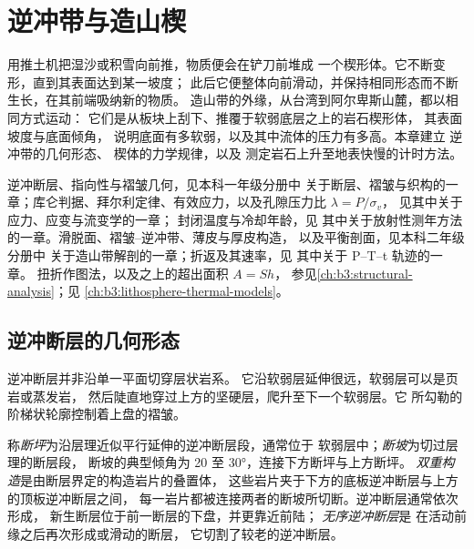 \chapter{逆冲带与造山楔}\label{ch:b3:orogenic-wedges}

用推土机把湿沙或积雪向前推，物质便会在铲刀前堆成
一个楔形体。它不断变形，直到其表面达到某一坡度；
此后它便整体向前滑动，并保持相同形态而不断生长，在其前端吸纳新的物质。
造山带的外缘，从台湾到阿尔卑斯山麓，都以相同方式运动：
它们是从板块上刮下、推覆于软弱底层之上的岩石楔形体，
其表面坡度与底面倾角，
说明底面有多软弱，以及其中流体的压力有多高。本章建立
逆冲带的几何形态、
楔体的力学规律，以及
测定岩石上升至地表快慢的计时方法。

\begin{recall}
逆冲断层、指向性与褶皱几何，见本科一年级分册中
关于断层、褶皱与织构的一章；库仑判据、拜尔利定律、有效应力，以及孔隙压力比 $\lambda = P/\sigma_v$，
见其中关于应力、应变与流变学的一章；
封闭温度与冷却年龄，见
其中关于放射性测年方法的一章。滑脱面、褶皱–逆冲带、薄皮与厚皮构造，
以及平衡剖面，见本科二年级分册中
关于造山带解剖的一章；折返及其速率，见
其中关于 P--T--t 轨迹的一章。
扭折作图法，以及之上的超出面积 $A = Sh$，
参见\cref{ch:b3:structural-analysis}；见
\cref{ch:b3:lithosphere-thermal-models}。
\end{recall}

\section{逆冲断层的几何形态}\label{sec:b3:orogenic-wedges:geometry}

逆冲断层并非沿单一平面切穿层状岩系。
它沿软弱层延伸很远，软弱层可以是页岩或蒸发岩，
然后陡直地穿过上方的坚硬层，爬升至下一个软弱层。它
所勾勒的阶梯状轮廓控制着上盘的褶皱。

\begin{definition}[断坡、断坪、双重构造与无序逆冲断层]\label{def:b3:orogenic-wedges:thrust-geometry}
称\emph{断坪}为沿层理近似平行延伸的逆冲断层段，通常位于
软弱层中；\emph{断坡}为切过层理的断层段，
断坡的典型倾角为 20 至 \ang{30}，连接下方断坪与上方断坪。
\emph{双重构造}是由断层界定的构造岩片的叠置体，
这些岩片夹于下方的底板逆冲断层与上方的顶板逆冲断层之间，
每一岩片都被连接两者的断坡所切断。逆冲断层通常依次形成，
新生断层位于前一断层的下盘，并更靠近前陆；
\emph{无序逆冲断层}是
在活动前缘之后再次形成或滑动的断层，
它切割了较老的逆冲断层。
\end{definition}

